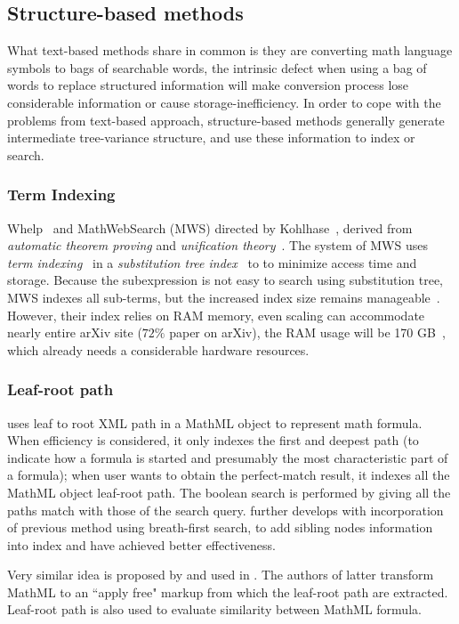 \subsection{Structure-based methods}
What text-based methods share in common is they are converting math language symbols to bags of searchable words, the intrinsic defect when using a bag of words to replace structured information will make conversion process lose considerable information or cause storage-inefficiency.
In order to cope with the problems from text-based approach, structure-based methods generally generate intermediate tree-variance structure, and use these information to index or search.

\subsubsection*{Term Indexing}
Whelp~\cite{whelp04} and MathWebSearch (MWS) directed by Kohlhase~\cite{Kohlhase06,Kohlhase0p4,Kohlhase0p5}, derived from \textit{automatic theorem proving} and \textit{unification theory}~\cite{AIbook}. The system of MWS uses \textit{term indexing}~\cite{graf96} in a \textit{substitution tree index}~\cite{graf96} to to minimize access time and storage. Because the subexpression is not easy to search using substitution tree, MWS indexes all sub-terms, but the increased index size remains manageable~\cite{Kohlhase06}. However, their index relies on RAM memory, even scaling can accommodate nearly entire arXiv site ($72\%$ paper on arXiv), the RAM usage will be 170 GB~\cite{Kohlhase0p5}, which already needs a considerable hardware resources.

\subsubsection*{Leaf-root path}
\label{leafrootmethod}
\cite{MathMLleafroot} uses leaf to root XML path in a MathML object to represent math formula. When efficiency is considered, it only indexes the first and deepest path (to indicate how a formula is started and presumably the most characteristic part of a formula); 
when user wants to obtain the perfect-match result, it indexes all the MathML object leaf-root path. The boolean search is performed by giving all the paths match with those of the search query. 
\cite{sefobyfo} further develops with incorporation of previous method using breath-first search, to add sibling nodes information into index and have achieved better effectiveness.

Very similar idea is proposed by \cite{signifjap} and used in \cite{signfused}. The authors of latter transform MathML to an ``apply free" markup from which the leaf-root path are extracted. Leaf-root path is also used to evaluate similarity between MathML formula.

